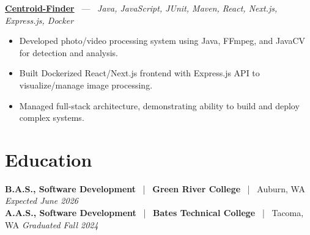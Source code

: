 \documentclass[10pt, letterpaper]{article}
\newcommand{\jobhead}[4]{%
  \vspace{5pt}%
  {\bfseries\color{dark}#1}%
  ~{\color{light}|}~%
  {\bfseries\color{navy}#2}%
  ~{\color{light}|}~%
  {\color{light}#3}%
  \hfill{\color{light}\small\textit{#4}}\\[-2pt]%
}
\newcommand{\projhead}[3]{%
  \vspace{5pt}%
  {\bfseries\color{dark}\href{#2}{#1}}%
  ~{\color{light}---}~%
  {\color{light}\small\textit{#3}}\\[-2pt]%
}
\begin{document}
\projhead{Centroid-Finder}{https://github.com/xavierb117/centroid-finder}{Java, JavaScript, JUnit, Maven, React, Next.js, Express.js, Docker}
\begin{itemize}
  \item Developed photo/video processing system using Java, FFmpeg, and JavaCV for detection and analysis.
  \item Built Dockerized React/Next.js frontend with Express.js API to visualize/manage image processing.
  \item Managed full-stack architecture, demonstrating ability to build and deploy complex systems.
\end{itemize}

\section{Education}

\jobhead{B.A.S., Software Development}{Green River College}{Auburn, WA}{Expected June 2026}
\jobhead{A.A.S., Software Development}{Bates Technical College}{Tacoma, WA}{Graduated Fall 2024}
\end{document}
